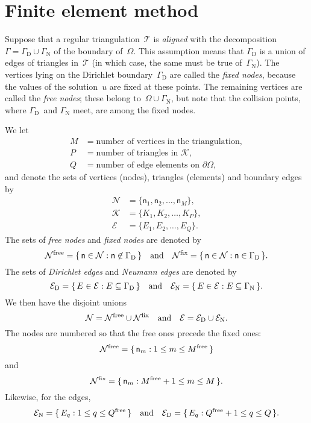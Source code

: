\section{Finite element method}

Suppose that a regular triangulation~$\mathcal{T}$ is \emph{aligned} with 
the decomposition $\Gamma=\Gamma_{\mathrm{D}}\cup\Gamma_{\mathrm{N}}$ of the 
boundary of~$\Omega$.  This assumption means that $\Gamma_{\mathrm{D}}$ 
is a union of edges of triangles in~$\mathcal{T}$ (in which 
case, the same must be true of~$\Gamma_{\mathrm{N}}$).  The vertices lying on 
the Dirichlet boundary~$\Gamma_{\mathrm{D}}$ are called the \emph{fixed nodes}, 
because the values of the solution~$u$ are fixed at these points.  The 
remaining vertices are called the \emph{free nodes}; these belong 
to~$\Omega\cup\Gamma_{\mathrm{N}}$, but note that the collision points, where
$\Gamma_{\mathrm{D}}$~and $\Gamma_{\mathrm{N}}$ meet, are among the fixed nodes.

We let
\begin{align*}
M&=\text{number of vertices in the triangulation},\\
P&=\text{number of triangles in $\mathcal{K}$,}\\
Q&=\text{number of edge elements on $\partial\Omega$,}
\end{align*}
and denote the sets of vertices (nodes), triangles (elements) and boundary edges
by
\begin{align*}
\mathcal{N}&=\{\mathsf{n}_1,\mathsf{n}_2,\ldots,\mathsf{n}_M\},\\
\mathcal{K}&=\{K_1,K_2,\ldots,K_P\},\\
\mathcal{E}&=\{E_1,E_2,\ldots,E_Q\}.
\end{align*}
The sets of \emph{free nodes} and \emph{fixed nodes} are denoted by
\[
\mathcal{N}^{\mathrm{free}}
        =\{\,\mathsf{n}\in\mathcal{N}:\mathsf{n}\not\in\Gamma_{\mathrm{D}}\,\}
\quad\text{and}\quad
\mathcal{N}^{\mathrm{fix}}
        =\{\,\mathsf{n}\in\mathcal{N}:\mathsf{n}\in\Gamma_{\mathrm{D}}\,\}.
\]
The sets of \emph{Dirichlet edges} and \emph{Neumann edges} are denoted by
\[
\mathcal{E}_{\mathrm{D}}=\{\,E\in\mathcal{E}:E\subseteq\Gamma_{\mathrm{D}}\,\}
\quad\text{and}\quad
\mathcal{E}_{\mathrm{N}}=\{\,E\in\mathcal{E}:E\subseteq\Gamma_{\mathrm{N}}\,\}.
\]
We then have the disjoint unions
\[
\mathcal{N}=\mathcal{N}^{\mathrm{free}}\cup\mathcal{N}^{\mathrm{fix}}
\quad\text{and}\quad
\mathcal{E}=\mathcal{E}_{\mathrm{D}}\cup\mathcal{E}_{\mathrm{N}}.
\]
The nodes are numbered so that the free ones precede the fixed ones:
\[
\mathcal{N}^{\mathrm{free}}=\{\,\mathsf{n}_m:1\le m\le M^{\mathrm{free}}\,\}
\]
and
\[
\mathcal{N}^{\mathrm{fix}}=\{\,\mathsf{n}_m:M^{\mathrm{free}}+1\le m\le M\,\}.
\]
Likewise, for the edges,
\[
\mathcal{E}_{\mathrm{N}}=\{\,E_q:1\le q\le Q^{\mathrm{free}}\,\}
\quad\text{and}\quad
\mathcal{E}_{\mathrm{D}}=\{\,E_q:Q^{\mathrm{free}}+1\le q\le Q\,\}.
\]

